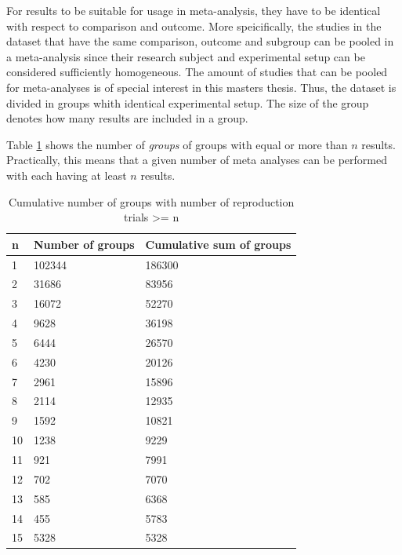 \documentclass[11pt,a4paper,twoside]{book}\usepackage[]{graphicx}\usepackage[]{color}
\begin{document}
\vspace{0mm}
For results to be suitable for usage in meta-analysis, they have to be identical with respect to comparison and outcome. More speicifically, the studies in the dataset that have the same comparison, outcome and subgroup can be pooled in a meta-analysis since their research subject and experimental setup can be considered sufficiently homogeneous. %
\vspace{0mm}
The amount of studies that can be pooled for meta-analyses is of special interest in this masters thesis. Thus, the dataset is divided in groups whith identical experimental setup. The size of the group denotes how many results are included in a group.

\vspace{0mm}
Table \ref{repr.groups} shows the number of \textit{groups} of groups with equal or more than $n$ results. Practically, this means that a given number of meta analyses can be performed with each having at least $n$ results.

\begin{table}[ht]
\centering
\begingroup\footnotesize
\begin{tabular}{lll}
  \hline
n & Number of groups & Cumulative sum of groups \\ 
  \hline
1 & 102344 & 186300 \\ 
  2 & 31686 & 83956 \\ 
  3 & 16072 & 52270 \\ 
  4 & 9628 & 36198 \\ 
  5 & 6444 & 26570 \\ 
  6 & 4230 & 20126 \\ 
  7 & 2961 & 15896 \\ 
  8 & 2114 & 12935 \\ 
  9 & 1592 & 10821 \\ 
  10 & 1238 & 9229 \\ 
  11 & 921 & 7991 \\ 
  12 & 702 & 7070 \\ 
  13 & 585 & 6368 \\ 
  14 & 455 & 5783 \\ 
  15 & 5328 & 5328 \\ 
   \hline
\end{tabular}
\endgroup
\caption{Cumulative number of groups with number of reproduction trials >= n} 
\label{repr.groups}
\end{table}
\end{document}
